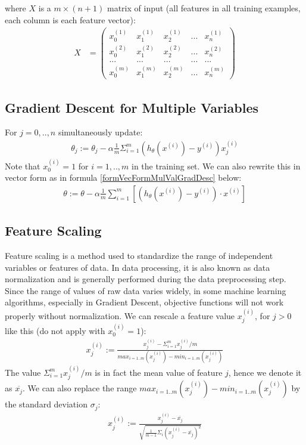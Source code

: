 where $X$ is a $m \times (n+1)$ matrix of input (all features in all training examples, each column is each feature vector):
\begin{align} \label{form:matX}
X &= \begin{pmatrix}
x_0^{(1)} & x_1^{(1)} & x_2^{(1)} & ... & x_n^{(1)} \\
x_0^{(2)} & x_1^{(2)} & x_2^{(2)} & ... & x_n^{(2)} \\
...       & ...       & ...       & ... & ...\\
x_0^{(m)} & x_1^{(m)} & x_2^{(m)} & ... & x_n^{(m)}
\end{pmatrix}
\end{align}

\subsection{Gradient Descent for Multiple Variables}
For $j = 0,..,n $ simultaneously update:
\begin{align}
\label{form:w2mulVarGradDesc}
\theta_j := \theta_j - \alpha \frac{1}{m} \Sigma_{i=1}^{m} (h_{\theta}(x^{(i)}) - y^{(i)})x_j^{(i)}  
\end{align}
Note that $x_0^{(i)} = 1$ for $i = 1,..,m$ in the training set. We can also rewrite this in vector form as in formula \eqref{formVecFormMulValGradDesc} below:
\begin{align} \label{formVecFormMulValGradDesc}
\theta := \theta - \alpha\frac{1}{m}\sum_{i=1}^{m}[(h_\theta(x^{(i)}) - y^{(i)}) \cdot x^{(i)}]
\end{align}

\subsection{Feature Scaling}
Feature scaling is a method used to standardize the range of independent variables or features of data. In data processing, it is also known as data normalization and is generally performed during the data preprocessing step. Since the range of values of raw data varies widely, in some machine learning algorithms, especially in Gradient Descent, objective functions will not work properly without normalization. We can rescale a feature value $x_j^{(i)}$, for $j > 0$ like this (do not apply with $x_0^{(i)} = 1$):
\begin{align}
x_j^{(i)} := \frac{x_j^{(i)} - \Sigma_{i=1}^{m} x_j^{(i)}/m}{max_{i=1..m}(x_j^{(i)}) - min_{i=1..m}(x_j^{(i)})} 
\end{align}
The value $\Sigma_{i=1}^{m} x_j^{(i)}/m$ is in fact the mean value of feature $j$, hence we denote it as $\overline{x_j}$. We can also replace the range $max_{i=1..m}(x_j^{(i)}) - min_{i=1..m}(x_j^{(i)})$ by the standard deviation $\sigma_j$:
\begin{align} \label{form:w2FeatScale}
x_j^{(i)} := \frac{x_j^{(i)} - \overline{x_j}}{\sqrt{\frac{1}{m-1}\Sigma_i(x_j^{(i)} - \overline{x_j})^2}} 
\end{align}

